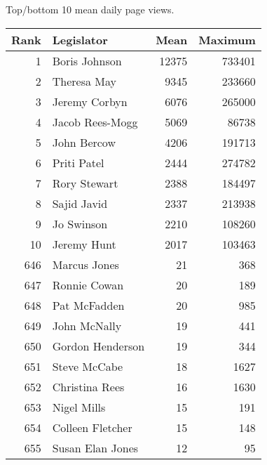 \centering
\caption{Top/bottom 10 mean daily page views.\label{tab:pageviewstopgbr}} 
\begingroup\scriptsize
\begin{tabular}{rlrr}
  \toprule
Rank & Legislator & Mean & Maximum \\ 
  \midrule
1 & Boris Johnson & 12375 & 733401 \\ 
  2 & Theresa May & 9345 & 233660 \\ 
  3 & Jeremy Corbyn & 6076 & 265000 \\ 
  4 & Jacob Rees-Mogg & 5069 & 86738 \\ 
  5 & John Bercow & 4206 & 191713 \\ 
   \midrule
6 & Priti Patel & 2444 & 274782 \\ 
  7 & Rory Stewart & 2388 & 184497 \\ 
  8 & Sajid Javid & 2337 & 213938 \\ 
  9 & Jo Swinson & 2210 & 108260 \\ 
  10 & Jeremy Hunt & 2017 & 103463 \\ 
   \midrule
646 & Marcus Jones & 21 & 368 \\ 
  647 & Ronnie Cowan & 20 & 189 \\ 
  648 & Pat McFadden & 20 & 985 \\ 
  649 & John McNally & 19 & 441 \\ 
  650 & Gordon Henderson & 19 & 344 \\ 
   \midrule
651 & Steve McCabe & 18 & 1627 \\ 
  652 & Christina Rees & 16 & 1630 \\ 
  653 & Nigel Mills & 15 & 191 \\ 
  654 & Colleen Fletcher & 15 & 148 \\ 
  655 & Susan Elan Jones & 12 & 95 \\ 
   \bottomrule
\end{tabular}
\endgroup
